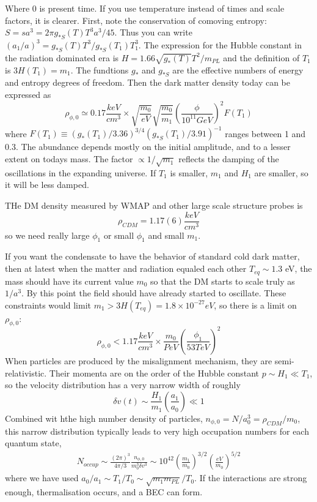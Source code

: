 \documentclass[11pt]{book}
\begin{document}
Where 0 is present time.
If you use temperature instead of times and scale factors, it is clearer. First, note the conservation of comoving entropy: $S = sa^3 = 2\pi g_{*S}(T)T^3a^3/45$. Thus you can write $(a_1/a)^3 = g_{*S}(T)T^3/g_{*S}(T_1)T_1^3$. The expression for the Hubble constant in the radiation dominated era is $H=1.66\sqrt{g_{*}(T)}T^2/m_{PL}$ and the definition of $T_1$ is $3H(T_1) = m_1$. The fundtions $g_*$ and $g_{*S}$ are the effective numbers of energy and entropy degrees of freedom. Then the dark matter density today can be expressed as
\[
\rho_{\phi,0} \simeq 0.17 \frac{keV}{cm^3} \times \sqrt{\frac{m_0}{eV}}\sqrt{\frac{m_0}{m_1}}(\frac{\phi}{10^11 GeV})^2 F(T_1)
\]
where $F(T_1) \equiv (g_*(T_1)/3.36)^{3/4}(g_{*S}(T_1)/3.91)^{-1}$ ranges between 1 and 0.3. The abundance depends mostly on the initial amplitude, and to a lesser extent on todays mass. The factor $\propto 1/\sqrt{m_1}$ reflects the damping of the oscillations in the expanding universe. If $T_1$ is smaller, $m_1$ and $H_1$ are smaller, so it will be less damped.

THe DM density measured by WMAP and other large scale structure probes is
\[
\rho_{CDM} = 1.17(6)\frac{keV}{cm^3}
\]
so we need really large $\phi_1$ or small $\phi_1$ and small $m_1$.

If you want the condensate to have the behavior of standard cold dark matter, then at latest when the matter and radiation equaled each other $T_{eq} \sim 1.3$ eV, the mass should have its current value $m_0$ so that the DM starts to scale truly as $1/a^3$. By this point the field should have already started to oscillate. These constraints would limit $m_1 > 3H(T_{eq}) = 1.8 \times 10^{-27} eV$, so there is a limit on $\rho_{\phi,0}$:
\[
\rho_{\phi,0} < 1.17 \frac{keV}{cm^3} \times \frac{m_0}{PeV} (\frac{\phi_1}{53 TeV})^2
\]
When particles are produced by the misalignment mechanism, they are semi-relativistic. Their momenta are on the order of the Hubble constant $p \sim H_1 \ll T_1$, so the velocity distribution has a very narrow width of roughly
\[
\delta v(t) \sim \frac{H_1}{m_1} (\frac{a_1}{a_0}) \ll 1
\]
Combined wit hthe high number density of particles, $n_{\phi,0} = N/a_0^3 = \rho_{CDM}/m_0$, this narrow distribution typically leads to very high occupation numbers for each quantum state,
\begin{multline}
N_{occup} \sim \frac{(2\pi)^3}{4\pi/3}\frac{n_{\phi,0}}{m_{0}^3\delta v^3} \sim 10^{42} (\frac{m_1}{m_0})^{3/2}(\frac{eV}{m_0})^{5/2}
\end{multline}
where we have used $a_0/a_1 \sim T_1/T_0 \sim \sqrt{m_1 m_{PL}}/T_0$. If the interactions are strong enough, thermalisation occurs, and a BEC can form.
\end{document}
